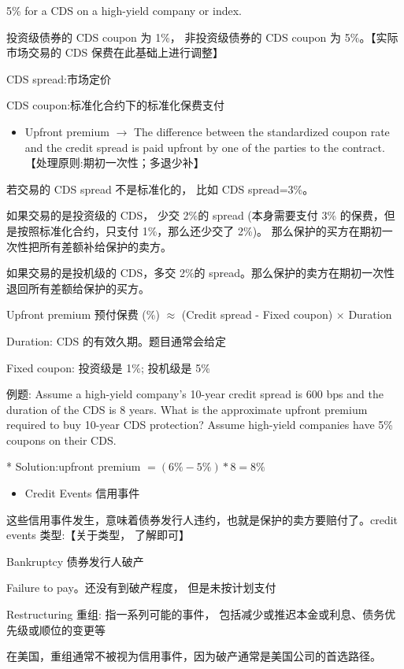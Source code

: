 5\% for a CDS on a high-yield company or index.

投资级债券的 CDS coupon 为 1\%， 非投资级债券的 CDS coupon 为 5\%。【实际市场交易的 CDS 保费在此基础上进行调整】

CDS spread:市场定价

CDS coupon:标准化合约下的标准化保费支付

\begin{itemize}
\item Upfront premium \(\rightarrow\) The difference between the standardized coupon rate and the credit spread is paid upfront by one of the parties to the contract.【处理原则:期初一次性；多退少补】
\end{itemize}

若交易的 CDS spread 不是标准化的， 比如 CDS spread=3\%。

如果交易的是投资级的 CDS， 少交 2\%的 spread (本身需要支付 3\% 的保费，但是按照标准化合约，只支付 1\%，那么还少交了 2\%)。 那么保护的买方在期初一次性把所有差额补给保护的卖方。

如果交易的是投机级的 CDS，多交 2\%的 spread。那么保护的卖方在期初一次性退回所有差额给保护的买方。

Upfront premium 预付保费 (\%) \(\approx\) (Credit spread - Fixed coupon) \(\times\) Duration

Duration: CDS 的有效久期。题目通常会给定

Fixed coupon: 投资级是 1\%; 投机级是 5\%

例题: Assume a high-yield company's 10-year credit spread is 600 bps and the duration of the CDS is 8 years. What is the approximate upfront premium required to buy 10-year CDS protection? Assume high-yield companies have 5\% coupons on their CDS.

* Solution:upfront premium \(= \left( {6\%  - 5\% }\right)  * 8 = 8\%\)

\begin{itemize}
\item Credit Events 信用事件
\end{itemize}

这些信用事件发生，意味着债券发行人违约，也就是保护的卖方要赔付了。credit events 类型:【关于类型， 了解即可】

Bankruptcy 债券发行人破产

Failure to pay。还没有到破产程度， 但是未按计划支付

Restructuring 重组: 指一系列可能的事件， 包括减少或推迟本金或利息、债务优先级或顺位的变更等

 在美国，重组通常不被视为信用事件，因为破产通常是美国公司的首选路径。

